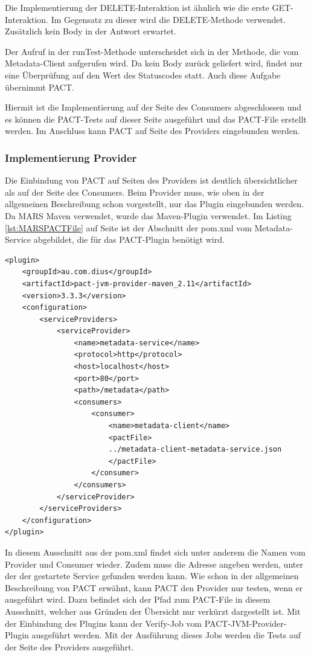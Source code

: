 \documentclass{llncs}
\begin{document}
Die Implementierung der DELETE-Interaktion ist ähnlich wie die erste GET-Interaktion. Im Gegensatz zu dieser wird die DELETE-Methode verwendet. Zusätzlich kein Body in der Antwort erwartet.

Der Aufruf in der runTest-Methode unterscheidet sich in der Methode, die vom Metadata-Client aufgerufen wird. Da kein Body zurück geliefert wird, findet nur eine Überprüfung auf den Wert des Statuscodes statt. Auch diese Aufgabe übernimmt PACT.

Hiermit ist die Implementierung auf der Seite des Consumers abgeschlossen und es können die PACT-Tests auf dieser Seite ausgeführt und das PACT-File erstellt werden. Im Anschluss kann PACT auf Seite des Providers eingebunden werden.
\subsubsection{Implementierung Provider}
Die Einbindung von PACT auf Seiten des Providers ist deutlich übersichtlicher als auf der Seite des Consumers. Beim Provider muss, wie oben in der allgemeinen Beschreibung schon vorgestellt, nur das Plugin eingebunden werden. Da MARS Maven verwendet, wurde das Maven-Plugin verwendet. Im Listing \ref{lst:MARSPACTFile} auf Seite \pageref{lst:MARSPACTFile} ist der Abschnitt der pom.xml vom Metadata-Service abgebildet, die für das PACT-Plugin benötigt wird. 

\lstset{language = Java}
\begin{lstlisting}[caption=Eintrag in der pom.xml,label={lst:MARSPACTFile}]
<plugin>
    <groupId>au.com.dius</groupId>
    <artifactId>pact-jvm-provider-maven_2.11</artifactId>
    <version>3.3.3</version>
    <configuration>
        <serviceProviders>
            <serviceProvider>
                <name>metadata-service</name>
                <protocol>http</protocol>
                <host>localhost</host>
                <port>80</port>
                <path>/metadata</path>
                <consumers>
                    <consumer>
                        <name>metadata-client</name>
                        <pactFile>
                        ../metadata-client-metadata-service.json
                        </pactFile>
                    </consumer>
                </consumers>
            </serviceProvider>
        </serviceProviders>
    </configuration>
</plugin>
\end{lstlisting}

In diesem Ausschnitt aus der pom.xml findet sich unter anderem die Namen vom Provider und Consumer wieder. Zudem muss die Adresse angeben werden, unter der der gestartete Service gefunden werden kann. Wie schon in der allgemeinen Beschreibung von PACT erwähnt, kann PACT den Provider nur testen, wenn er ausgeführt wird. Dazu befindet sich der Pfad zum PACT-File in diesem Ausschnitt, welcher aus Gründen der Übersicht nur verkürzt dargestellt ist.
Mit der Einbindung des Plugins kann der Verify-Job vom  PACT-JVM-Provider-Plugin ausgeführt werden. Mit der Ausführung dieses Jobs werden die Tests auf der Seite des Providers ausgeführt.
\end{document}
